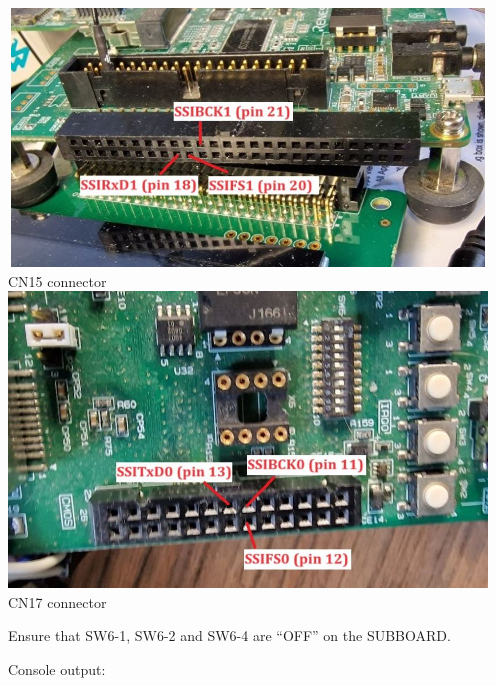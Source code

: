 \documentclass[11pt,a4paper,oneside]{article}
\begin{document}
\begin{center}
\includegraphics[width=5in,height=2.7in]{./media/CN15.jpg}
\newline
CN15 connector
\newline
\includegraphics[width=5in,height=3.09in]{./media/CN17.jpg}
\newline
CN17 connector
\end{center}

Ensure that SW6-1, SW6-2 and SW6-4 are ``OFF'' on the SUBBOARD.

Console output:
\end{document}
